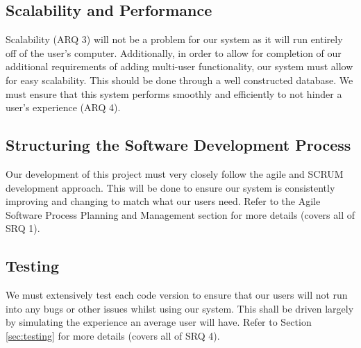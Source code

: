 \documentclass[11pt]{article}
\begin{document}
\subsection{Scalability and Performance}

Scalability (ARQ 3) will not be a problem for our system as it will run entirely
off of the user's computer. Additionally, in order to allow for completion of our
additional requirements of adding multi-user functionality, our system must
allow for easy scalability. This should be done through a well constructed
database. We must ensure that this system performs smoothly and efficiently to not
hinder a user's experience (ARQ 4).


\subsection{Structuring the Software Development Process}

Our development of this project must very closely follow the agile and SCRUM
development approach. This will be done to ensure our system is consistently
improving and changing to match what our users need. Refer to the Agile Software
Process Planning and Management section for more details (covers all of SRQ 1).

\subsection{Testing}

We must extensively test each code version to ensure that our users will not run
into any bugs or other issues whilst using our system. This shall be driven
largely by simulating the experience an average user will have. Refer to
Section \ref{sec:testing} for more details (covers all of SRQ 4).

\newpage
\end{document}
